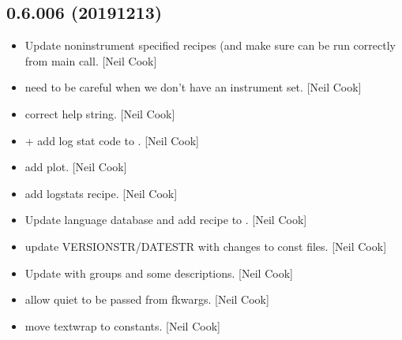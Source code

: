 \documentclass[a4paper,10pt,english]{report}
\begin{document}
\subsection{0.6.006 (2019\sphinxhyphen{}12\sphinxhyphen{}13)}
\label{\detokenize{misc/changelog:id32}}\begin{itemize}
\item {} 
Update non\sphinxhyphen{}instrument specified recipes (and make sure
 can be run correctly from main call. {[}Neil Cook{]}

\item {} 
 \sphinxhyphen{} need to be careful when we don’t have an instrument
set. {[}Neil Cook{]}

\item {} 
 \sphinxhyphen{} correct help string. {[}Neil Cook{]}

\item {} 
 +  \sphinxhyphen{} add
log stat code to . {[}Neil Cook{]}

\item {} 
 \sphinxhyphen{} add  plot. {[}Neil Cook{]}

\item {} 
 \sphinxhyphen{} add logstats recipe.
{[}Neil Cook{]}

\item {} 
Update language database and add recipe to . {[}Neil Cook{]}

\item {} 
 \sphinxhyphen{} update
VERSIONSTR/DATESTR with changes to const files. {[}Neil Cook{]}

\item {} 
Update  with groups and some
descriptions. {[}Neil Cook{]}

\item {} 
 \sphinxhyphen{} allow quiet to be passed from fkwargs.
{[}Neil Cook{]}

\item {} 
 \sphinxhyphen{} move textwrap to constants. {[}Neil Cook{]}


\end{itemize}
\end{document}
